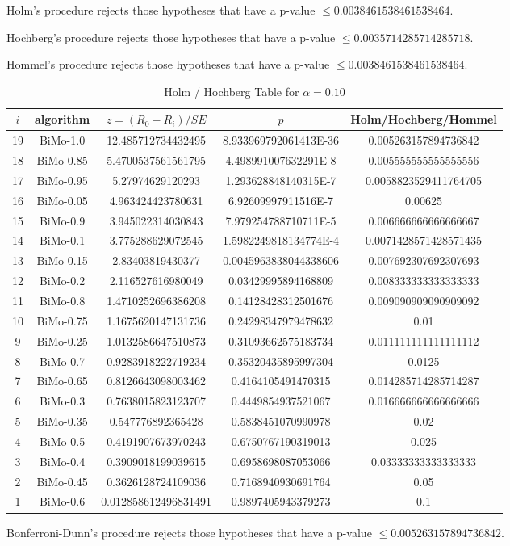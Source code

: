 \documentclass[a4paper,10pt]{article}
\begin{document}
\begin{landscape}
Holm's procedure rejects those hypotheses that have a p-value $\le0.0038461538461538464$.


Hochberg's procedure rejects those hypotheses that have a p-value $\le0.0035714285714285718$.


Hommel's procedure rejects those hypotheses that have a p-value $\le0.0038461538461538464$.


\begin{table}[!htp]
\centering\tiny
\caption{Holm / Hochberg Table for $\alpha=0.10$}
\begin{tabular}{ccccc}
$i$&algorithm&$z=(R_0 - R_i)/SE$&$p$&Holm/Hochberg/Hommel\\
\hline
19&BiMo-1.0&12.485712734432495&8.933969792061413E-36&0.005263157894736842\\
18&BiMo-0.85&5.4700537561561795&4.498991007632291E-8&0.005555555555555556\\
17&BiMo-0.95&5.27974629120293&1.293628848140315E-7&0.0058823529411764705\\
16&BiMo-0.05&4.963424423780631&6.92609997911516E-7&0.00625\\
15&BiMo-0.9&3.945022314030843&7.979254788710711E-5&0.006666666666666667\\
14&BiMo-0.1&3.775288629072545&1.5982249818134774E-4&0.0071428571428571435\\
13&BiMo-0.15&2.83403819430377&0.0045963838044338606&0.007692307692307693\\
12&BiMo-0.2&2.116527616980049&0.03429995894168809&0.008333333333333333\\
11&BiMo-0.8&1.4710252696386208&0.14128428312501676&0.009090909090909092\\
10&BiMo-0.75&1.1675620147131736&0.24298347979478632&0.01\\
9&BiMo-0.25&1.0132586647510873&0.31093662575183734&0.011111111111111112\\
8&BiMo-0.7&0.9283918222719234&0.35320435895997304&0.0125\\
7&BiMo-0.65&0.8126643098003462&0.4164105491470315&0.014285714285714287\\
6&BiMo-0.3&0.7638015823123707&0.4449854937521067&0.016666666666666666\\
5&BiMo-0.35&0.547776892365428&0.5838451070990978&0.02\\
4&BiMo-0.5&0.4191907673970243&0.6750767190319013&0.025\\
3&BiMo-0.4&0.3909018199039615&0.6958698087053066&0.03333333333333333\\
2&BiMo-0.45&0.3626128724109036&0.7168940930691764&0.05\\
1&BiMo-0.6&0.012858612496831491&0.9897405943379273&0.1\\
\hline
\end{tabular}
\end{table}
Bonferroni-Dunn's procedure rejects those hypotheses that have a p-value $\le0.005263157894736842$.



\end{landscape}
\end{document}
